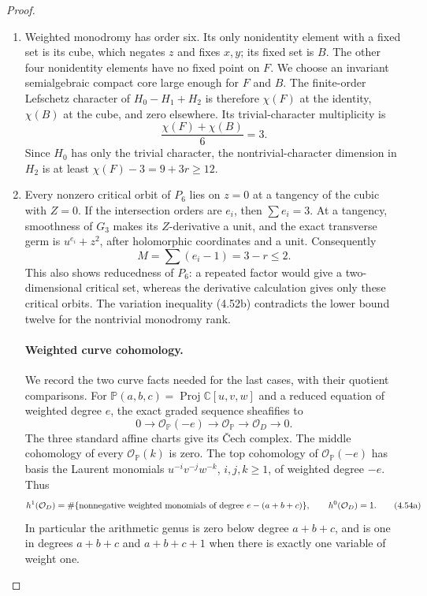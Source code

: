 \begin{proof}
\begin{enumerate}[label={$\langle1\rangle$\arabic*.},leftmargin=*]
\item Weighted monodromy has order six. Its only
nonidentity element with a fixed set is its cube,
which negates $z$ and fixes $x,y$; its fixed set is
$B$. The other four nonidentity elements have no
fixed point on $F$. We choose an invariant
semialgebraic compact core large enough for $F$
and $B$. The finite-order Lefschetz character of
$H_0-H_1+H_2$ is therefore $\chi(F)$ at the identity,
$\chi(B)$ at the cube, and zero elsewhere. Its
trivial-character multiplicity is
\[
                       \frac{\chi(F)+\chi(B)}6=3.
\]
Since $H_0$ has only the trivial character, the
nontrivial-character dimension in $H_2$ is at least
$\chi(F)-3=9+3r\ge12$.

\item Every nonzero critical orbit of $P_6$ lies on $z=0$
at a tangency of the cubic with $Z=0$. If the
intersection orders are $e_i$, then $\sum e_i=3$.
At a tangency, smoothness of $G_3$ makes its
$Z$-derivative a unit, and the exact transverse
germ is $u^{e_i}+z^2$, after holomorphic coordinates
and a unit. Consequently
\[
                       M=\sum(e_i-1)=3-r\le2.
\]
This also shows reducedness of $P_6$: a repeated
factor would give a two-dimensional critical set,
whereas the derivative calculation gives only
these critical orbits. The variation inequality
(4.52b) contradicts the lower bound twelve for
the nontrivial monodromy rank.

\paragraph{Weighted curve cohomology.}
We record the two curve facts needed for the last
cases, with their quotient comparisons. For
$\mathbb P(a,b,c)=\operatorname{Proj}\mathbb C[u,v,w]$
and a reduced equation of weighted degree $e$,
the exact graded sequence sheafifies to
\[
 0\longrightarrow\mathcal O_{\mathbb P}(-e)
 \longrightarrow\mathcal O_{\mathbb P}
 \longrightarrow\mathcal O_D\longrightarrow0.
\]
The three standard affine charts give its \v Cech
complex. The middle cohomology of every
$\mathcal O_{\mathbb P}(k)$ is zero. The top
cohomology of $\mathcal O_{\mathbb P}(-e)$ has
basis the Laurent monomials $u^{-i}v^{-j}w^{-k}$,
$i,j,k\ge1$, of weighted degree $-e$. Thus
\[
 h^1(\mathcal O_D)=
 \#\{\hbox{nonnegative weighted monomials of degree }
                         e-(a+b+c)\},
 \qquad h^0(\mathcal O_D)=1.                         \tag{4.54a}
\]
In particular the arithmetic genus is zero below
degree $a+b+c$, and is one in degrees $a+b+c$
and $a+b+c+1$ when there is exactly one variable
of weight one.


\end{enumerate}
\end{proof}
